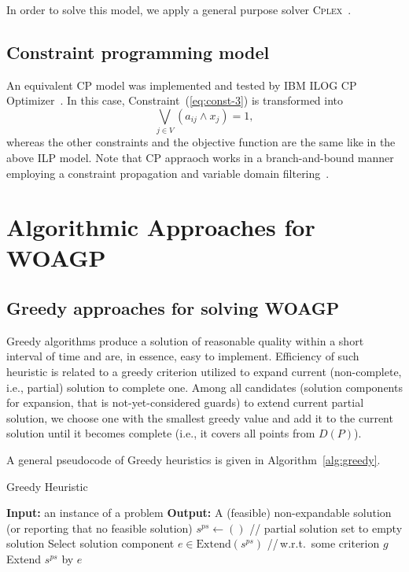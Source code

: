 \documentclass[runningheads,a4paper]{elsarticle}
\begin{document}
	In order to solve this model, we apply a general purpose solver \textsc{Cplex}~\cite{lima2010ibm}.
	\subsection{Constraint programming model} An equivalent CP model was implemented and tested by IBM ILOG CP Optimizer~\cite{laborie2018ibm}. In this case,  Constraint~(\ref{eq:const-3}) is transformed into
	\begin{equation}
	\bigvee_{ j \in V } (a_{ij} \wedge x_j) = 1,
	\end{equation}
	whereas the other constraints and the objective function are the same like in the above ILP model. Note that CP appraoch works in a branch-and-bound manner employing a constraint propagation and variable domain filtering~\cite{rossi2006handbook}.
	\section{Algorithmic Approaches for WOAGP}
	\subsection{Greedy approaches for solving WOAGP}
 Greedy algorithms produce a solution of reasonable quality within a short interval of time and are, in essence, easy to implement. Efficiency of such  heuristic is related to a greedy criterion utilized to expand current (non-complete, i.e., partial) solution to complete one. Among all candidates (solution components for expansion, that is not-yet-considered guards) to extend current partial solution,  we choose one with the smallest greedy value and add it to the current solution until it becomes complete (i.e., it covers all  points from $D(P)$).
	
	A general pseudocode of Greedy heuristics is given in Algorithm~\ref{alg:greedy}.
	
	\begin{algorithm}[!t]
		\caption{Greedy Heuristic}\label{alg:greedy}
		\begin{algorithmic}[1]
			\State \textbf{Input:} an instance of a problem
			\State \textbf{Output:} A (feasible) non-expandable solution (or reporting that no feasible solution)
			\State $s^{ps} \gets ()$ \hspace{0.3cm}// partial solution set to empty solution
			\State Select solution component $e \in  \text{Extend}(s^{ps})$ \hspace{0.3cm}//\,w.r.t.\  some criterion $g$
			\State Extend $s^{ps}$ by $e$
			\EndWhile
		\end{algorithmic}
	\end{algorithm}
\end{document}
